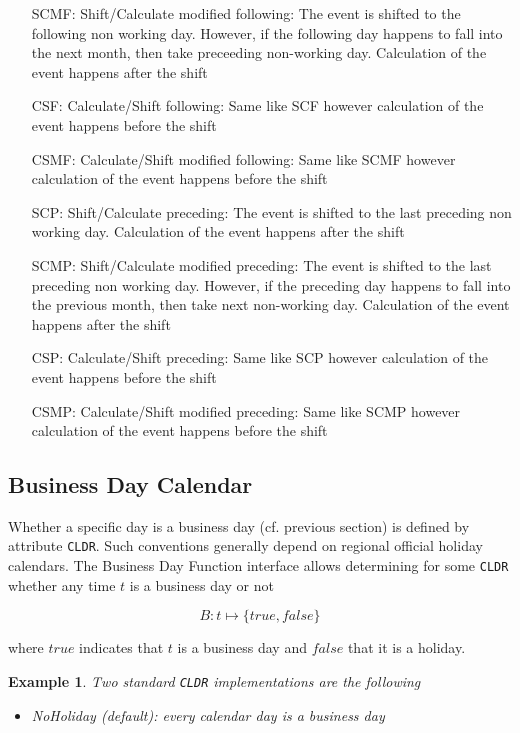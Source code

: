 \documentclass[9pt,oneside]{amsart}
\newtheorem{example}{Example}
\newcommand{\attr}[1]{\texttt{#1}}
\begin{document}
\begin{multicols}{2}
\begin{itemize}
	\item[SCMF:] Shift/Calculate modified following: The event is shifted to the following non working day. However, if the following day happens to fall into the next month, then take preceeding non-working day. Calculation of the event happens after the shift

	\item[CSF:] Calculate/Shift following: Same like SCF however calculation of the event happens before the shift

	\item[CSMF:] Calculate/Shift modified following: Same like SCMF however calculation of the event happens before the shift

	\item[SCP:] Shift/Calculate preceding: The event is shifted to the last preceding non working day. Calculation of the event happens after the shift

	\item[SCMP:] Shift/Calculate modified preceding: The event is shifted to the last preceding non working day. However, if the preceding day happens to fall into the previous month, then take next non-working day. Calculation of the event happens after the shift

	\item[CSP:] Calculate/Shift preceding: Same like SCP however calculation of the event happens before the shift

	\item[CSMP:] Calculate/Shift modified preceding: Same like SCMP however calculation of the event happens before the shift
\end{itemize}


\subsection{Business Day Calendar}\label{sec:bdcal}

Whether a specific day is a business day (cf. previous section) is defined by attribute \attr{CLDR}. Such conventions generally depend on regional official holiday calendars. The Business Day Function interface allows determining for some \attr{CLDR} whether any time $t$ is a business day or not

\[
	B: t \mapsto \{true, false\}
\]

where $true$ indicates that $t$ is a business day and $false$ that it is a holiday.


\begin{example}
Two standard \attr{CLDR} implementations are the following
\begin{itemize}
	\item NoHoliday (default): every calendar day is a business day


\end{itemize}
\end{example}
\end{multicols}
\end{document}
